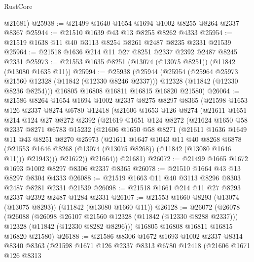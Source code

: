 \begin{lexlean}{RustCore}
\begin{coremodule}
      @21681)
@25938 := @21499 @1640 @1654 @1694 @1002 @8255 @8264 @2337 @8367
@25944 := @21510 @1639 @43 @13 @8255 @8262 @4333
@25954 := @21519 @1638 @11 @40 @3113 @8254 @8261 @2487 @8235 @2331 @21539
@25964 := @21518 @1636 @214 @11 @27 @8251 @2337 @2392 @2487 @8245 @2331
@25973 := @21553 @1635 @8251 (@13074 (@13075 @8251)) (@11842 (@13080 @1635 @11))
@25994 := @25938
    (@25944
      (@25954
        (@25964 @25973 @21560 @12328 (@11842 (@12330 @8246 @2337)))
        @12328
        (@11842 (@12330 @8236 @8254)))
      @16805
      @16808
      @16811
      @16815
      @16820
      @21580)
@26064 := @21586
    @8264
    @1654
    @1694
    @1002
    @2337
    @8275
    @8297
    @8365
    (@21598
      @1653
      @126
      @2337
      @8274
      @6780
      @12418
      (@21606
        @1653
        @126
        @8274
        (@21611
          @1651
          @214
          @124
          @27
          @8272
          @2392
          (@21619
            @1651
            @124
            @8272
            (@21624
              @1650
              @58
              @2337
              @8271
              @6783
              @15232
              (@21606
                @1650
                @58
                @8271
                (@21611
                  @1636
                  @1649
                  @11
                  @43
                  @8251
                  @8270
                  @25973
                  (@21611
                    @1647
                    @1043
                    @11
                    @40
                    @8268
                    @6878
                    (@21553 @1646 @8268 (@13074 (@13075 @8268)) (@11842 (@13080 @1646 @11)))
                    @21943)))
              @21672))
          @21664))
      @21681)
@26072 := @21499 @1665 @1672 @1693 @1002 @8297 @8306 @2337 @8365
@26078 := @21510 @1664 @43 @13 @8297 @8304 @4333
@26088 := @21519 @1663 @11 @40 @3113 @8296 @8303 @2487 @8281 @2331 @21539
@26098 := @21518 @1661 @214 @11 @27 @8293 @2337 @2392 @2487 @1284 @2331
@26107 := @21553 @1660 @8293 (@13074 (@13075 @8293)) (@11842 (@13080 @1660 @11))
@26128 := @26072
    (@26078
      (@26088
        (@26098 @26107 @21560 @12328 (@11842 (@12330 @8288 @2337)))
        @12328
        (@11842 (@12330 @8282 @8296)))
      @16805
      @16808
      @16811
      @16815
      @16820
      @21580)
@26188 := @21586
    @8306
    @1672
    @1693
    @1002
    @2337
    @8314
    @8340
    @8363
    (@21598
      @1671
      @126
      @2337
      @8313
      @6780
      @12418
      (@21606
        @1671
        @126
        @8313

\end{coremodule}
\end{lexlean}

